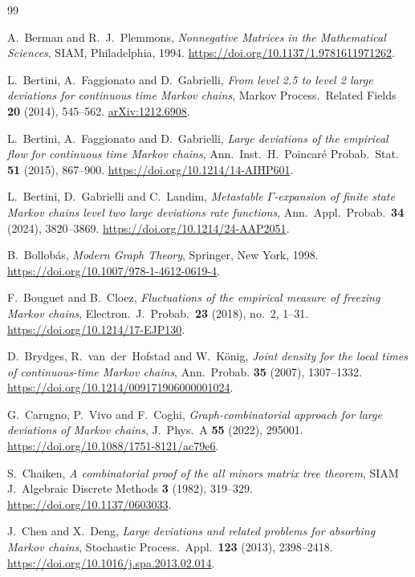 \documentclass[EJP,preprint]{ejpecp}
\theoremstyle{ejpecpbodyit}
\begin{document}
\begin{thebibliography}{99}

A.~Berman and R.~J.~Plemmons, \emph{Nonnegative Matrices in the
Mathematical Sciences}, SIAM, Philadelphia, 1994.
\url{https://doi.org/10.1137/1.9781611971262}.

L.~Bertini, A.~Faggionato and D.~Gabrielli, \emph{From level 2.5 to level 2
large deviations for continuous time Markov chains}, Markov Process.~Related
Fields \textbf{20} (2014), 545--562.
\href{https://arxiv.org/abs/1212.6908}{arXiv:1212.6908}.

L.~Bertini, A.~Faggionato and D.~Gabrielli, \emph{Large deviations of the
empirical flow for continuous time Markov chains}, Ann.~Inst.~H.~Poincar\'e
Probab.~Stat. \textbf{51} (2015), 867--900.
\url{https://doi.org/10.1214/14-AIHP601}.

L.~Bertini, D.~Gabrielli and C.~Landim, \emph{Metastable $\Gamma$-expansion
of finite state Markov chains level two large deviations rate functions},
Ann.~Appl.~Probab.~\textbf{34} (2024), 3820--3869.
\url{https://doi.org/10.1214/24-AAP2051}.

B.~Bollob\'as, \emph{Modern Graph Theory}, Springer, New York, 1998.
\url{https://doi.org/10.1007/978-1-4612-0619-4}.

F.~Bouguet and B.~Cloez, \emph{Fluctuations of the empirical measure of freezing
Markov chains}, Electron.~J.~Probab.~\textbf{23} (2018), no.~2, 1--31.
\url{https://doi.org/10.1214/17-EJP130}.

D.~Brydges, R.~van~der~Hofstad and W.~K\"onig, \emph{Joint density for the
local times of continuous-time Markov chains}, Ann.~Probab. \textbf{35}
(2007), 1307--1332. \url{https://doi.org/10.1214/009171906000001024}.

G.~Carugno, P.~Vivo and F.~Coghi, \emph{Graph-combinatorial approach for
large deviations of Markov chains}, J.~Phys.~A \textbf{55} (2022), 295001.
\url{https://doi.org/10.1088/1751-8121/ac79e6}.

S.~Chaiken, \emph{A combinatorial proof of the all minors matrix tree theorem},
SIAM J.~Algebraic Discrete Methods \textbf{3} (1982), 319--329.
\url{https://doi.org/10.1137/0603033}.

J.~Chen and X.~Deng, \emph{Large deviations and related problems for absorbing
Markov chains}, Stochastic Process.~Appl.~\textbf{123} (2013), 2398--2418.
\url{https://doi.org/10.1016/j.spa.2013.02.014}.


\end{thebibliography}
\end{document}
